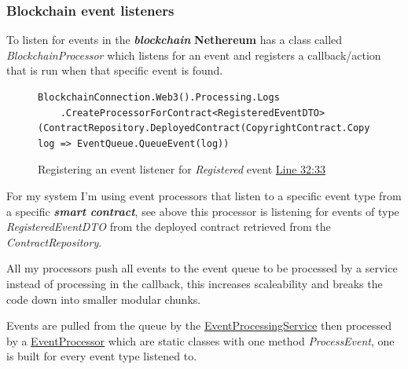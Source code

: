 \documentclass[12pt]{article}
\newcommand{\keyword}[1]{\textbf{\textit{#1}}}
\begin{document}
\subsubsection{Blockchain event listeners}

To listen for events in the \keyword{blockchain} \textbf{Nethereum} has a class called \textit{BlockchainProcessor} which listens for an event and registers a callback/action that is run when that specific event is found.

\begin{figure}[H]
\caption{Registering an event listener for \textit{Registered} event \href{https://github.com/MrHarrisonBarker/CRPL/blob/main/CRPL.Web/Services/Background/BlockchainEventListener.cs}{Line 32:33}}
\centering
\begin{lstlisting}[language=CSharp]
BlockchainConnection.Web3().Processing.Logs
	.CreateProcessorForContract<RegisteredEventDTO>(ContractRepository.DeployedContract(CopyrightContract.Copyright).Address, log => EventQueue.QueueEvent(log))
\end{lstlisting}
\end{figure}

For my system I'm using event processors that listen to a specific event type from a specific \keyword{smart contract}, see above this processor is listening for events of type \textit{RegisteredEventDTO} from the deployed contract retrieved from the \textit{ContractRepository}.

All my processors push all events to the event queue to be processed by a service instead of processing in the callback, this increases scaleability and breaks the code down into smaller modular chunks.

Events are pulled from the queue by the \href{https://github.com/MrHarrisonBarker/CRPL/blob/main/CRPL.Web/Services/Background/EventProcessingService.cs}{EventProcessingService} then processed by a \href{https://github.com/MrHarrisonBarker/CRPL/tree/main/CRPL.Web/Core/EventProcessors}{EventProcessor} which are static classes with one method \textit{ProcessEvent}, one is built for every event type listened to. 
\end{document}
